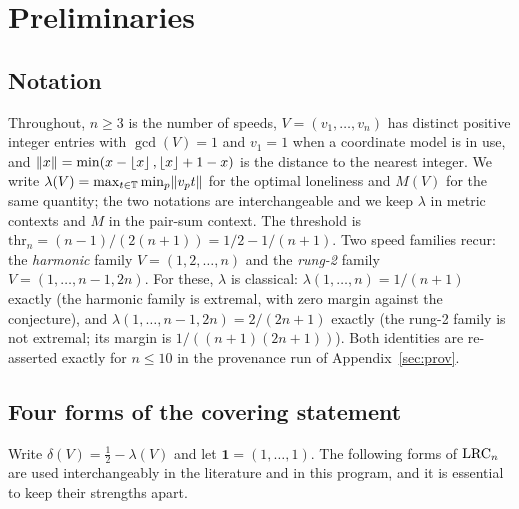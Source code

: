 
\section{Preliminaries}\label{sec:prelim}

\subsection{Notation}

Throughout, $n\ge 3$ is the number of speeds, $V=(v_1,\dots,v_n)$ has
distinct positive integer entries with $\gcd(V)=1$ and $v_1=1$ when a
coordinate model is in use, and $\lVert x \rVert=\min(x-\left\lfloor x \right\rfloor,
\left\lfloor x \right\rfloor+1-x)$ is the distance to the nearest integer. We write
$\lambda(V)=\max_{t\in\mathbb{T}}\min_p \lVert v_p t \rVert$ for the optimal loneliness
and $M(V)$ for the same quantity; the two notations are interchangeable
and we keep $\lambda$ in metric contexts and $M$ in the
pair-sum context. The threshold is
$\mathrm{thr}_n=(n-1)/(2(n+1))=1/2-1/(n+1)$. Two speed families recur:
the \emph{harmonic} family $V=(1,2,\dots,n)$ and the \emph{rung-2}
family $V=(1,\dots,n-1,2n)$. For these, $\lambda$ is classical:
$\lambda(1,\dots,n)=1/(n+1)$ exactly (the harmonic family is extremal,
with zero margin against the conjecture), and
$\lambda(1,\dots,n-1,2n)=2/(2n+1)$ exactly (the rung-2 family is not
extremal; its margin is $1/((n+1)(2n+1))$). Both identities are
re-asserted exactly for $n\le 10$ in the provenance run of
Appendix~\ref{sec:prov}.

\subsection{Four forms of the covering statement}

Write $\delta(V)=\tfrac12-\lambda(V)$ and let $\mathbf{1}=(1,\dots,1)$.
The following forms of $\mathrm{LRC}_n$ are used interchangeably in the
literature and in this program, and it is essential to keep their
strengths apart.

